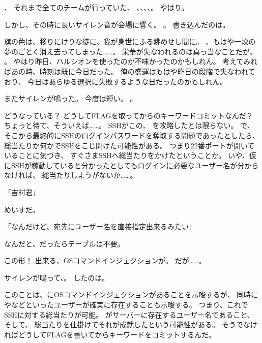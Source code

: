 、
それまで全てのチームが行っていた、
\urandom、\ZxZ、\wasamusume、\mofupp、。
やはり。

しかし、その時に長いサイレン音が会場に響く。
。
書き込んだのは\ZxZ。

旗の色は、移りにけりな徒に、我が身世にふる眺めせし間に。
、もはや一炊の夢のごとく消え去ってしまった……。
栄華が失なわれるのは真っ当なことだが、
。
やはり昨日、ハルシオンを使ったのが不味かったのかもしれん。
考えてみればあの時、時刻は既に今日だった。
俺の盛運はもはや昨日の段階で失なわれており、
今日はあらゆる選択に失敗するような日だったのかもしれん。

またサイレンが鳴った。
今度は短い。
。

どうなっている？
どうしてFLAGを取ってからのキーワードコミットなんだ？
ちょっと待て、そういえば……。
SSHがこの、
を攻略したとは限らない。
で、
そこから最終的にSSHのログインパスワードを奪取する問題であったとしたら、
総当たりか何かでSSHをこじ開けた可能性がある。
つまり22番ポートが開いていることに気づき、
すぐさまSSHへ総当たりをかけたということか。
いや、仮にSSHが稼動していると分かったとしてもログインに必要なユーザー名が分からなければ、
総当たりしようがないか……。

「吉村君」

めいすだ。

「なんだけど、宛先にユーザー名を直接指定出来るみたい」

なんだと、だったらテーブルは不要。



この形！
出来る、OSコマンドインジェクションが。
だが……。

サイレンが鳴って、。
したのは\ZxZ。

このことは、にOSコマンドインジェクションがあることを示唆するが、
同時にやなどといったユーザーが確実に存在することも示唆する。
つまり、これでSSHに対する総当たりが可能。
がサーバーに存在するユーザー名であること、
そして、
総当たりを仕掛けてそれが成就したという可能性がある。
そうでなければどうしてFLAGを書いてからキーワードをコミットするんだ。

